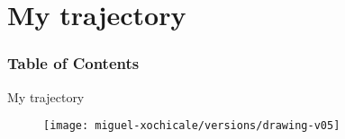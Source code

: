\section{My trajectory}

\begin{frame}
  \frametitle{Table of Contents}
  \tableofcontents[currentsection]
\end{frame}



{
\begin{frame}{My trajectory}

  \begin{figure}
  \centering
  \texttt{[image: miguel-xochicale/versions/drawing-v05]}
  \end{figure}

\end{frame}
}

